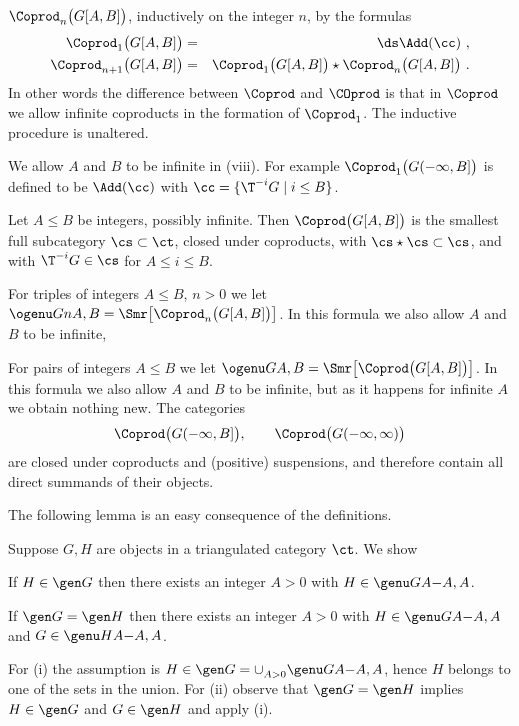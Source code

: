 \documentclass[11pt]{amsart}
\begin{document}
  $\Coprod_n\big(G[A,B]\big)$, inductively on the integer $n$, by the formulas
\begin{eqnarray*}
\Coprod_1^{}\big(G[A,B]\big)&=&\ds\Add(\cc)\ ,\\
\Coprod_{n+1}^{}\big(G[A,B]\big)&=&
\Coprod_1^{}\big(G[A,B]\big)\star\Coprod_n^{}\big(G[A,B]\big)\ .
\end{eqnarray*}
In other words the difference between $\Coprod$ and $\COprod$
is that in $\Coprod$ we allow infinite coproducts in
the formation of $\Coprod_1$. The inductive procedure is unaltered.
\item
  We allow $A$ and $B$ to be infinite in (viii). For example
  $\Coprod_1^{}\big(G(-\infty,B]\big)$ is defined
  to be $\Add(\cc)$ with $\cc=\{\T^{-i}G\mid i\leq B\}$.
\item
  Let $A\leq B$ be integers, possibly infinite. Then $\Coprod\big(G[A,B]\big)$
  is the smallest full subcategory $\cs\subset\ct$, closed under coproducts,
  with $\cs\star\cs\subset\cs$, and with $\T^{-i}G\in\cs$ for
  $A\leq i\leq B$.
\item
  For triples of
  integers $A\leq B$, $n>0$ we let
  $\ogenu Gn{A,B}=\Smr\big[\Coprod_n\big(G[A,B]\big)\big]$.
  In this formula we also allow $A$ and $B$ to be infinite, 
\item
  For pairs of integers $A\leq B$ we
  let $\ogenu G{}{A,B}=\Smr\big[\Coprod\big(G[A,B]\big)\big]$.
  In this formula we also allow $A$ and $B$ to be infinite, but as
  it happens for infinite $A$ we obtain nothing new. The
  categories
  \[\Coprod\big(G(-\infty,B]\big),\qquad
  \Coprod\big(G(-\infty,\infty)\big)\]
  are closed under coproducts and (positive) suspensions, and therefore
  contain all direct summands of their objects.
\ee
\ermd

The following lemma is an easy consequence of the definitions.

Suppose $G,H$ are objects in a triangulated category $\ct$. We show
\be
\item
  If $H\in\gen G{}$ then there exists an integer $A>0$ with
  $H\in\genu GA{-A,A}$.
\item
  If $\gen G{}=\gen H{}$ then there exists 
an integer $A>0$ with $H\in\genu GA{-A,A}$ and $G\in\genu HA{-A,A}$.
\ee
\elem

\prf
For (i) the assumption is $H\in\gen G{}=\cup_{A>0}^{}\genu  GA{-A,A}$, hence
$H$ belongs to one of the sets in the union. For (ii) observe that
$\gen G{}=\gen H{}$ implies $H\in\gen G{}$ and $G\in\gen H{}$ and apply (i).
\eprf
\end{document}

